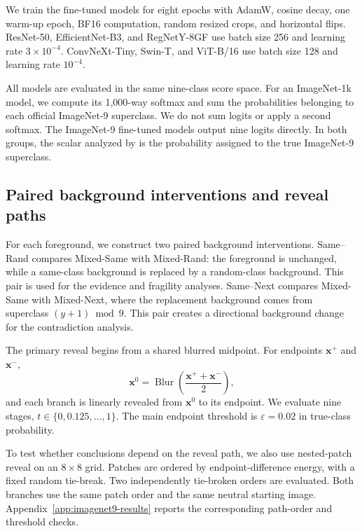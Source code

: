 We train the fine-tuned models for eight epochs with AdamW, cosine decay, one warm-up epoch, BF16 computation, random resized crops, and horizontal flips. ResNet-50, EfficientNet-B3, and RegNetY-8GF use batch size 256 and learning rate $3\times10^{-4}$. ConvNeXt-Tiny, Swin-T, and ViT-B/16 use batch size 128 and learning rate $10^{-4}$.

All models are evaluated in the same nine-class score space. For an ImageNet-1k model, we compute its 1,000-way softmax and sum the probabilities belonging to each official ImageNet-9 superclass. We do not sum logits or apply a second softmax. The ImageNet-9 fine-tuned models output nine logits directly. In both groups, the scalar analyzed by \decaf is the probability assigned to the true ImageNet-9 superclass.

\subsection{Paired background interventions and reveal paths}

For each foreground, we construct two paired background interventions. Same--Rand compares Mixed-Same with Mixed-Rand: the foreground is unchanged, while a same-class background is replaced by a random-class background. This pair is used for the evidence and fragility analyses. Same--Next compares Mixed-Same with Mixed-Next, where the replacement background comes from superclass $(y+1)\bmod 9$. This pair creates a directional background change for the contradiction analysis.

The primary reveal begins from a shared blurred midpoint. For endpoints $\mathbf x^{+}$ and $\mathbf x^{-}$,
\begin{equation}
    \mathbf x^{0}
    =
    \operatorname{Blur}\!\left(
        \frac{\mathbf x^{+}+\mathbf x^{-}}{2}
    \right),
\end{equation}
and each branch is linearly revealed from $\mathbf x^{0}$ to its endpoint. We evaluate nine stages,
$t\in\{0,0.125,\ldots,1\}$. The main endpoint threshold is $\varepsilon=0.02$ in true-class probability.

To test whether conclusions depend on the reveal path, we also use nested-patch reveal on an $8\times8$ grid. Patches are ordered by endpoint-difference energy, with a fixed random tie-break. Two independently tie-broken orders are evaluated. Both branches use the same patch order and the same neutral starting image. Appendix~\ref{app:imagenet9-results} reports the corresponding path-order and threshold checks.

